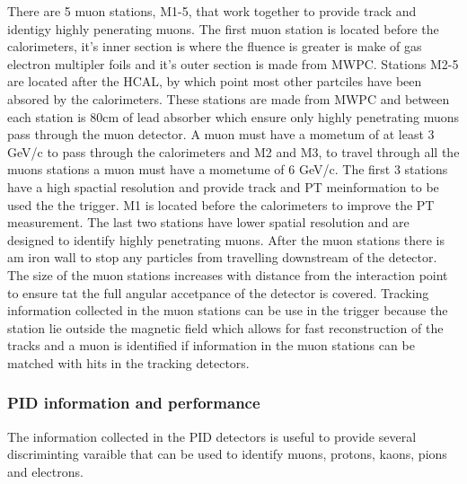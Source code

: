 There are 5 muon stations, M1-5, that work together to provide track and identigy highly penerating muons. The first muon station is located before the calorimeters, it's inner section is where the fluence is greater is make of gas electron multipler foils and it's outer section is made from MWPC. Stations M2-5 are located after the HCAL, by which point most other partciles have been absored by the calorimeters. These stations are made from MWPC and between each station is 80cm of lead absorber which ensure only highly penetrating muons pass through the muon detector. A muon must have a mometum of at least 3 GeV/c to pass through the calorimeters and M2 and M3, to travel through all the muons stations a muon must have a mometume of 6 GeV/c. 
The first 3 stations have a high spactial resolution and provide track and PT meinformation to be used the the trigger. M1 is located before the calorimeters to improve the PT measurement. The last two stations have lower spatial resolution and are designed to identify highly penetrating muons. After the muon stations there is am iron wall to stop any particles from travelling downstream of the detector. The size of the muon stations increases with distance from the interaction point to ensure tat the full angular accetpance of the detector is covered. Tracking information collected in the muon stations can be use in the trigger because the station lie outside the magnetic field which allows for fast reconstruction of the tracks and a muon is identified if information in the muon stations can be matched with hits in the tracking detectors. 

\subsubsection{PID information and performance}
\label{PID_variables}

The information collected in the PID detectors is useful to provide several discriminting varaible that can be used to identify muons, protons, kaons, pions and electrons.

